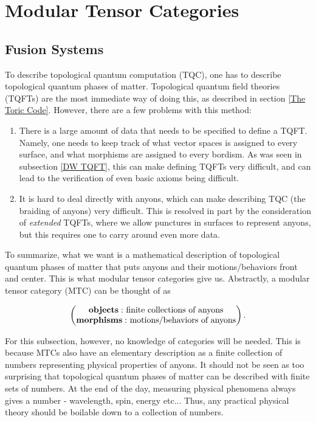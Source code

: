 \documentclass{article}
\theoremstyle{definition}
\numberwithin{figure}{section}
\begin{document}
\section{Modular Tensor Categories}
\label{Modular Tensor Categories}

\subsection{Fusion Systems}
\label{Fusion systems}

To describe topological quantum computation (TQC), one has to describe topological quantum phases of matter. Topological quantum field theories (TQFTs) are the most immediate way of doing this, as described in section \ref{The Toric Code}. However, there are a few problems with this method:

\begin{enumerate}
\item There is a large amount of data that needs to be specified to define a TQFT. Namely, one needs to keep track of what vector spaces is assigned to every surface, and what morphisms are assigned to every bordism. As was seen in subsection \ref{DW TQFT}, this can make defining TQFTs very difficult, and can lead to the verification of even basic axioms being difficult.

\item It is hard to deal directly with anyons, which can make describing TQC (the braiding of anyons) very difficult. This is resolved in part by the consideration of \textit{extended} TQFTs, where we allow punctures in surfaces to represent anyons, but this requires one to carry around even more data.
\end{enumerate}

To summarize, what we want is a mathematical description of topological quantum phases of matter that puts anyons and their motions/behaviors front and center. This is what modular tensor categories give us. Abstractly, a modular tensor category (MTC) can be thought of as

$$
\begin{pmatrix}
\bold{objects:}\text{ finite collections of anyons} \\
\bold{morphisms:}\text{ motions/behaviors of anyons}
\end{pmatrix}.
$$

For this subsection, however, no knowledge of categories will be needed. This is because MTCs also have an elementary description as a finite collection of numbers representing physical properties of anyons. It should not be seen as too surprising that topological quantum phases of matter can be described with finite sets of numbers. At the end of the day, measuring physical phenomena always gives a number - wavelength, spin, energy etc... Thus, any practical physical theory should be boilable down to a collection of numbers.
\end{document}
